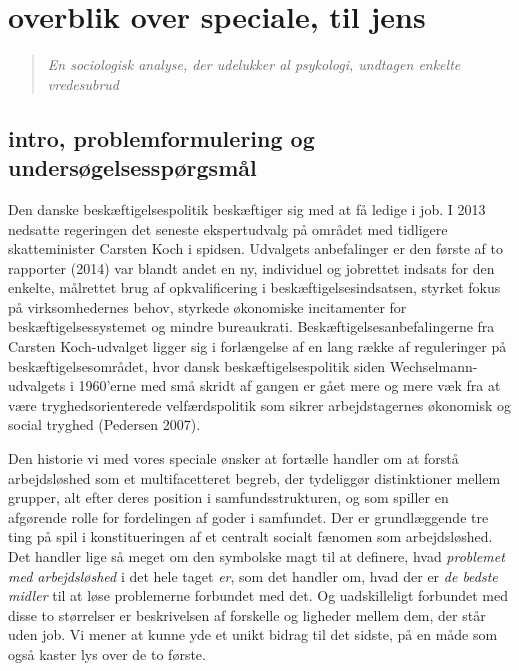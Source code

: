 
\chapter{overblik over speciale, til jens} \label{intro}
%
\begin{quote} \small %
\emph{En sociologisk analyse, der udelukker al psykologi, undtagen enkelte vredesubrud} 
\end{quote}
%

\section{intro, problemformulering og undersøgelsesspørgsmål \label{}}

Den danske beskæftigelsespolitik beskæftiger sig med at få ledige i job. I 2013 nedsatte regeringen det seneste ekspertudvalg på området med tidligere skatteminister Carsten Koch i spidsen. Udvalgets anbefalinger er den første af to rapporter (2014) var blandt andet en ny, individuel og jobrettet indsats for den enkelte, målrettet brug af opkvalificering i beskæftigelsesindsatsen, styrket fokus på virksomhedernes behov, styrkede økonomiske incitamenter for beskæftigelsessystemet og mindre bureaukrati. Beskæftigelsesanbefalingerne fra Carsten Koch-udvalget ligger sig i forlængelse af en lang række af reguleringer på beskæftigelsesområdet, hvor dansk beskæftigelsespolitik siden Wechselmann-udvalgets i 1960'erne med små skridt af gangen er gået mere og mere væk fra at være tryghedsorienterede velfærdspolitik som sikrer arbejdstagernes økonomisk og social tryghed (Pedersen 2007).

Den historie vi med vores speciale ønsker at fortælle handler om at forstå arbejdsløshed som et multifacetteret begreb, der tydeliggør distinktioner mellem grupper, alt efter deres position i samfundsstrukturen, og som spiller en afgørende rolle for fordelingen af goder i samfundet. Der er grundlæggende tre ting på spil i konstitueringen af et centralt socialt fænomen som arbejdsløshed. Det handler lige så meget om den symbolske magt til at definere, hvad \emph{problemet med arbejdsløshed} i det hele taget \emph{er}, som det handler om, hvad der er \emph{de bedste midler} til at løse problemerne forbundet med det. Og uadskilleligt forbundet med disse to størrelser er beskrivelsen af forskelle og ligheder mellem dem, der står uden job. Vi mener at kunne yde et unikt bidrag til det sidste, på en måde som også kaster lys over de to første.

